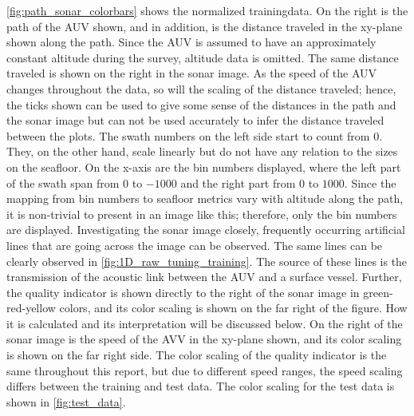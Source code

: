 \cref{fig:path_sonar_colorbars} shows the normalized trainingdata. On the right is the path of the AUV shown, and in addition, is the distance traveled in the xy-plane shown along the path. Since the AUV is assumed to have an approximately constant altitude during the survey, altitude data is omitted. The same distance traveled is shown on the right in the sonar image. As the speed of the AUV changes throughout the data, so will the scaling of the distance traveled; hence, the ticks shown can be used to give some sense of the distances in the path and the sonar image but can not be used accurately to infer the distance traveled between the plots. The swath numbers on the left side start to count from $0$. They, on the other hand, scale linearly but do not have any relation to the sizes on the seafloor. On the x-axis are the bin numbers displayed, where the left part of the swath span from $0$ to $-1000$ and the right part from $0$ to $1000$. Since the mapping from bin numbers to seafloor metrics vary with altitude along the path, it is non-trivial to present in an image like this; therefore, only the bin numbers are displayed. Investigating the sonar image closely, frequently occurring artificial lines that are going across the image can be observed. The same lines can be clearly observed in \cref{fig:1D_raw_tuning_training}. The source of these lines is the transmission of the acoustic link between the AUV and a surface vessel. Further, the quality indicator is shown directly to the right of the sonar image in green-red-yellow colors, and its color scaling is shown on the far right of the figure. How it is calculated and its interpretation will be discussed below. On the right of the sonar image is the speed of the AVV in the xy-plane shown, and its color scaling is shown on the far right side. The color scaling of the quality indicator is the same throughout this report, but due to different speed ranges, the speed scaling differs between the training and test data. The color scaling for the test data is shown in \cref{fig:test_data}. 

